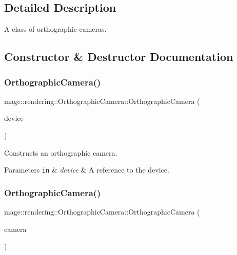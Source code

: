 \subsection{Detailed Description}
A class of orthographic cameras. 

\subsection{Constructor \& Destructor Documentation}
\hypertarget{classmage_1_1rendering_1_1_orthographic_camera_aba148b4da1141b5fa3dfc684e86dfc16}{}\label{classmage_1_1rendering_1_1_orthographic_camera_aba148b4da1141b5fa3dfc684e86dfc16} 
\subsubsection{\texorpdfstring{Orthographic\+Camera()}{OrthographicCamera()}\hspace{0.1cm}{\footnotesize\ttfamily [1/3]}}
{\footnotesize\ttfamily mage\+::rendering\+::\+Orthographic\+Camera\+::\+Orthographic\+Camera (\begin{DoxyParamCaption}\item[{I\+D3\+D11\+Device \&}]{device }\end{DoxyParamCaption})}

Constructs an orthographic camera.


\begin{DoxyParams}[1]{Parameters}
\mbox{\tt in}  & {\em device} & A reference to the device. \\
\hline
\end{DoxyParams}
\hypertarget{classmage_1_1rendering_1_1_orthographic_camera_a0bd37447138230a1a4900f503a2d1299}{}\label{classmage_1_1rendering_1_1_orthographic_camera_a0bd37447138230a1a4900f503a2d1299} 
\subsubsection{\texorpdfstring{Orthographic\+Camera()}{OrthographicCamera()}\hspace{0.1cm}{\footnotesize\ttfamily [2/3]}}
{\footnotesize\ttfamily mage\+::rendering\+::\+Orthographic\+Camera\+::\+Orthographic\+Camera (\begin{DoxyParamCaption}\item[{const \hyperlink{classmage_1_1rendering_1_1_orthographic_camera}{Orthographic\+Camera} \&}]{camera }\end{DoxyParamCaption})\hspace{0.3cm}{\ttfamily [delete]}}

